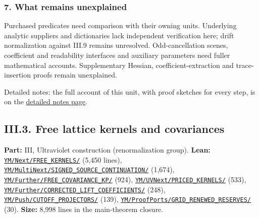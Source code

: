 \documentclass[
  letterpaper,
  11pt]{article}
\begin{document}
\subsubsection{7. What remains
unexplained}\label{what-remains-unexplained-4}

Purchased predicates need comparison with their owning units. Underlying
analytic suppliers and dictionaries lack independent verification here;
drift normalization against III.9 remains unresolved. Odd-cancellation
scenes, coefficient and readability interfaces and auxiliary parameters
need fuller mathematical accounts. Supplementary Hessian,
coefficient-extraction and trace-insertion proofs remain unexplained.

Detailed notes: the full account of this unit, with proof sketches for
every step, is on the
\href{https://github.com/scottnarmstrong/yang-mills-informalization/blob/main/outline/notes/III-2.md}{detailed
notes page}.

\subsection{III.3. Free lattice kernels and
covariances}\label{iii.3.-free-lattice-kernels-and-covariances}

\textbf{Part:} III, Ultraviolet construction (renormalization group).
\textbf{Lean:}
\href{https://github.com/yang-mills-group/OpenAI-YM-20261028/tree/3456e5e75cf8d4cd558955a5c7638fba2d68f464/YM/Next/FREE_KERNELS}{\texttt{YM/Next/FREE\_KERNELS/}}
(5,450 lines),
\href{https://github.com/yang-mills-group/OpenAI-YM-20261028/tree/3456e5e75cf8d4cd558955a5c7638fba2d68f464/YM/MultiNext/SIGNED_SOURCE_CONTINUATION}{\texttt{YM/MultiNext/SIGNED\_SOURCE\_CONTINUATION/}}
(1,674),
\href{https://github.com/yang-mills-group/OpenAI-YM-20261028/tree/3456e5e75cf8d4cd558955a5c7638fba2d68f464/YM/Further/FREE_COVARIANCE_KP}{\texttt{YM/Further/FREE\_COVARIANCE\_KP/}}
(924),
\href{https://github.com/yang-mills-group/OpenAI-YM-20261028/tree/3456e5e75cf8d4cd558955a5c7638fba2d68f464/YM/UVNext/PRICED_KERNELS}{\texttt{YM/UVNext/PRICED\_KERNELS/}}
(533),
\href{https://github.com/yang-mills-group/OpenAI-YM-20261028/tree/3456e5e75cf8d4cd558955a5c7638fba2d68f464/YM/Further/CORRECTED_LIFT_COEFFICIENTS}{\texttt{YM/Further/CORRECTED\_LIFT\_COEFFICIENTS/}}
(248),
\href{https://github.com/yang-mills-group/OpenAI-YM-20261028/tree/3456e5e75cf8d4cd558955a5c7638fba2d68f464/YM/Push/CUTOFF_PROJECTORS}{\texttt{YM/Push/CUTOFF\_PROJECTORS/}}
(139),
\href{https://github.com/yang-mills-group/OpenAI-YM-20261028/tree/3456e5e75cf8d4cd558955a5c7638fba2d68f464/YM/ProofPorts/GRID_RENEWED_RESERVES}{\texttt{YM/ProofPorts/GRID\_RENEWED\_RESERVES/}}
(30). \textbf{Size:} 8,998 lines in the main-theorem closure.
\end{document}
